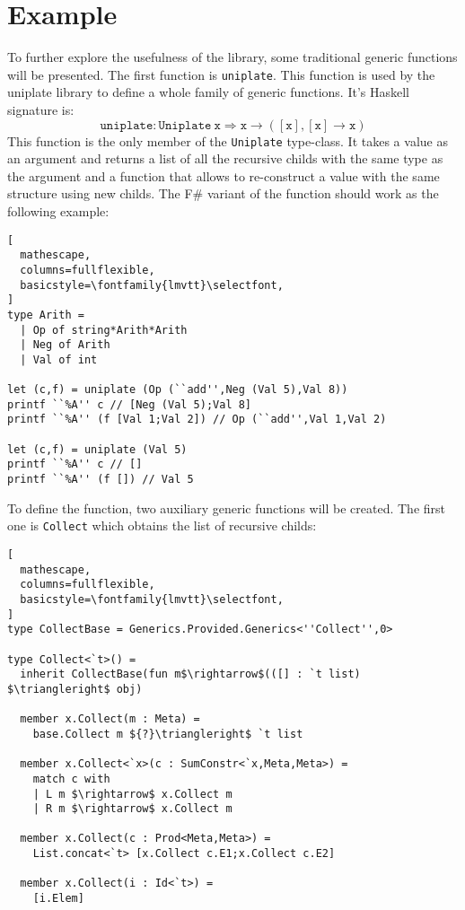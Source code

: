 \documentclass{sigplanconf}
\begin{document}
\section{Example}
\label{sec:uniplate}
To further explore the usefulness of the library, some
traditional generic functions will be presented. The
first function is \verb+uniplate+. This function is used
by the uniplate library \cite{Uniplate} to define
a whole family of generic functions. It's Haskell
signature is: 
\[
\mathtt{uniplate}:\mathtt{Uniplate\ x}
\Rightarrow \mathtt{x} \rightarrow ([\mathtt{x}],[\mathtt{x}]\rightarrow \mathtt{x})
\]
This function is the only member of the \verb+Uniplate+
type-class. It takes a value as an argument and returns
a list of all the recursive childs with the same type
as the argument and a function that allows to re-construct
a value with the same structure using new childs. The
F\# variant of the function should work as the following
example:
\begin{lstlisting}[
  mathescape,
  columns=fullflexible,
  basicstyle=\fontfamily{lmvtt}\selectfont,
]
type Arith =
  | Op of string*Arith*Arith
  | Neg of Arith
  | Val of int
  
let (c,f) = uniplate (Op (``add'',Neg (Val 5),Val 8))
printf ``%A'' c // [Neg (Val 5);Val 8]
printf ``%A'' (f [Val 1;Val 2]) // Op (``add'',Val 1,Val 2)

let (c,f) = uniplate (Val 5)
printf ``%A'' c // []
printf ``%A'' (f []) // Val 5

\end{lstlisting}
To define the function, two auxiliary generic functions will be
created. The first one is \verb+Collect+ which obtains the list
of recursive childs:
\begin{lstlisting}[
  mathescape,
  columns=fullflexible,
  basicstyle=\fontfamily{lmvtt}\selectfont,
]
type CollectBase = Generics.Provided.Generics<''Collect'',0>

type Collect<`t>() =
  inherit CollectBase(fun m$\rightarrow$(([] : `t list) $\triangleright$ obj)

  member x.Collect(m : Meta) =
    base.Collect m ${?}\triangleright$ `t list

  member x.Collect<`x>(c : SumConstr<`x,Meta,Meta>) =
    match c with
    | L m $\rightarrow$ x.Collect m
    | R m $\rightarrow$ x.Collect m

  member x.Collect(c : Prod<Meta,Meta>) =
    List.concat<`t> [x.Collect c.E1;x.Collect c.E2]

  member x.Collect(i : Id<`t>) =
    [i.Elem]
\end{lstlisting}
\end{document}
